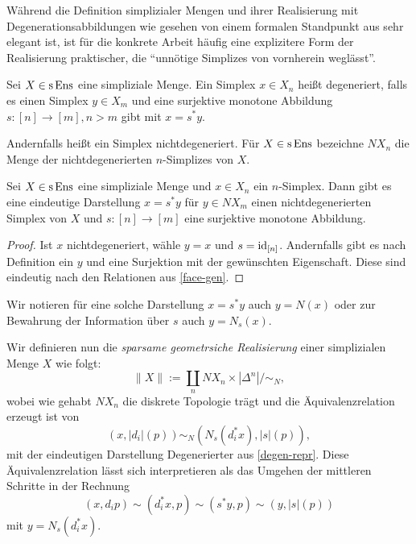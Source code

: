 Während die Definition simplizialer Mengen und ihrer Realisierung mit
Degenerationsabbildungen wie gesehen von einem formalen Standpunkt aus
sehr elegant ist, ist für die konkrete Arbeit häufig eine explizitere
Form der Realisierung praktischer, die ``unnötige Simplizes von
vornherein weglässt''.
\begin{defn}[\cite{GM}, I.2.9]
  Sei $X \in \operatorname{s}\operatorname{Ens}$ eine simpliziale Menge. Ein Simplex $x \in X_n$
  heißt degeneriert, falls es einen Simplex $y \in X_m$ und eine
  surjektive monotone Abbildung $s: [n] \to [m], n > m$ gibt mit $x =
  s^* y$.
\end{defn}
Andernfalls heißt ein Simplex nichtdegeneriert. Für $X \in \operatorname{s}\operatorname{Ens}$
bezeichne $NX_n$ die Menge der nichtdegenerierten $n$-Simplizes von
$X$.
\begin{lemma} \label{degen-repr}
  Sei $X \in \operatorname{s}\operatorname{Ens}$ eine simpliziale Menge und $x \in X_n$ ein
  $n$-Simplex. Dann gibt es eine eindeutige Darstellung $x = s^* y$
  für $y \in NX_m$ einen nichtdegenerierten Simplex von $X$ und $s:
  [n] \to [m]$ eine surjektive monotone Abbildung.
\end{lemma}
\begin{proof}
  Ist $x$ nichtdegeneriert, wähle $y = x$ und $s =
  \operatorname{id}_{[n]}$. Andernfalls gibt es nach Definition ein $y$ und eine
  Surjektion mit der gewünschten Eigenschaft. Diese sind eindeutig
  nach den Relationen aus \ref{face-gen}.
\end{proof}
Wir notieren für eine solche Darstellung $x = s^* y$ auch $y = N(x)$
oder zur Bewahrung der Information über $s$ auch $y = N_s(x)$.

Wir definieren nun die \emph{sparsame geometrsiche Realisierung} einer
simplizialen Menge $X$ wie folgt:
\[ \| X \| := \coprod_n NX_n \times |\Delta^n| / \sim_N ,\]
wobei wie gehabt $NX_n$ die diskrete Topologie trägt und die
Äquivalenzrelation erzeugt ist von
\[ (x, |d_i|(p)) \sim_N (N_s(d_i^* x), |s|(p)), \]
mit der eindeutigen Darstellung Degenerierter aus
\ref{degen-repr}. Diese Äquivalenzrelation lässt sich interpretieren
als das Umgehen der mittleren Schritte in der Rechnung
\[ (x, d_i p) \sim (d_i^* x, p) \sim (s^* y, p)
   \sim (y, |s|(p)) \]
mit $y = N_s(d_i^* x)$.
   
